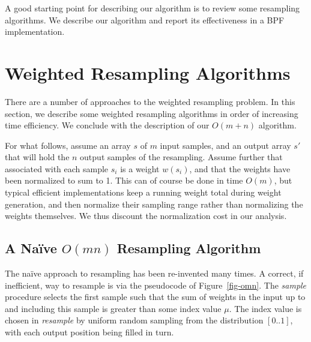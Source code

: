 \documentclass[12pt]{article}
\begin{document}
  A good starting point for describing our algorithm is to
  review some resampling algorithms.  We describe our
  algorithm and report its effectiveness in a BPF
  implementation.

\section{Weighted Resampling Algorithms}

  There are a number of approaches to the weighted
  resampling problem.  In this section, we describe some
  weighted resampling algorithms in order of increasing time
  efficiency.  We conclude with the description of our
  $O(m + n)$ algorithm.

  For what follows, assume an array $s$ of $m$ input
  samples, and an output array $s'$ that will hold the $n$
  output samples of the resampling.  Assume further that
  associated with each sample $s_i$ is a weight $w(s_i)$,
  and that the weights have been normalized to sum to 1.
  This can of course be done in time $O(m)$, but typical
  efficient implementations keep a running weight total
  during weight generation, and then normalize their
  sampling range rather than normalizing the weights
  themselves.  We thus discount the normalization cost in
  our analysis.

\subsection{A Na\"ive $O(mn)$ Resampling Algorithm}\label{sec-naive}

  The na\"ive approach to resampling has been re-invented
  many times.  A correct, if inefficient, way to resample is
  via the pseudocode of Figure~\ref{fig-omn}.  The {\em
  sample} procedure selects the first sample such that the
  sum of weights in the input up to and including this
  sample is greater than some index value $\mu$.  The index
  value is chosen in {\em resample} by uniform random
  sampling from the distribution $[0..1]$, with each output
  position being filled in turn.
\end{document}
